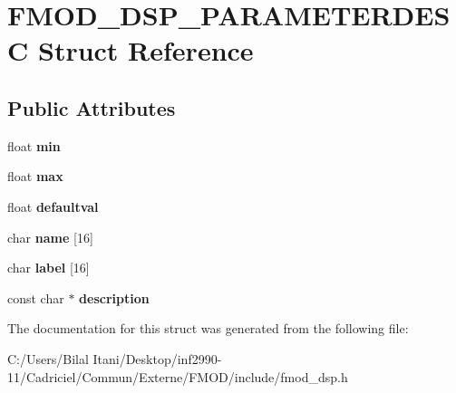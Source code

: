 \hypertarget{struct_f_m_o_d___d_s_p___p_a_r_a_m_e_t_e_r_d_e_s_c}{}\section{F\+M\+O\+D\+\_\+\+D\+S\+P\+\_\+\+P\+A\+R\+A\+M\+E\+T\+E\+R\+D\+E\+SC Struct Reference}
\label{struct_f_m_o_d___d_s_p___p_a_r_a_m_e_t_e_r_d_e_s_c}
\subsection*{Public Attributes}
\begin{DoxyCompactItemize}
\item 
float {\bfseries min}\hypertarget{struct_f_m_o_d___d_s_p___p_a_r_a_m_e_t_e_r_d_e_s_c_a6a70d0988ed0a13192f2d2beb2bd5595}{}\label{struct_f_m_o_d___d_s_p___p_a_r_a_m_e_t_e_r_d_e_s_c_a6a70d0988ed0a13192f2d2beb2bd5595}

\item 
float {\bfseries max}\hypertarget{struct_f_m_o_d___d_s_p___p_a_r_a_m_e_t_e_r_d_e_s_c_aabb0d4e04d947e9830378115e3085402}{}\label{struct_f_m_o_d___d_s_p___p_a_r_a_m_e_t_e_r_d_e_s_c_aabb0d4e04d947e9830378115e3085402}

\item 
float {\bfseries defaultval}\hypertarget{struct_f_m_o_d___d_s_p___p_a_r_a_m_e_t_e_r_d_e_s_c_a9f47edb0a65cceaa81dd3cc77a272734}{}\label{struct_f_m_o_d___d_s_p___p_a_r_a_m_e_t_e_r_d_e_s_c_a9f47edb0a65cceaa81dd3cc77a272734}

\item 
char {\bfseries name} \mbox{[}16\mbox{]}\hypertarget{struct_f_m_o_d___d_s_p___p_a_r_a_m_e_t_e_r_d_e_s_c_a1619c32ff0267079429a9fa4c76f5745}{}\label{struct_f_m_o_d___d_s_p___p_a_r_a_m_e_t_e_r_d_e_s_c_a1619c32ff0267079429a9fa4c76f5745}

\item 
char {\bfseries label} \mbox{[}16\mbox{]}\hypertarget{struct_f_m_o_d___d_s_p___p_a_r_a_m_e_t_e_r_d_e_s_c_a989bbcd725bbe64d8ec330be19037d78}{}\label{struct_f_m_o_d___d_s_p___p_a_r_a_m_e_t_e_r_d_e_s_c_a989bbcd725bbe64d8ec330be19037d78}

\item 
const char $\ast$ {\bfseries description}\hypertarget{struct_f_m_o_d___d_s_p___p_a_r_a_m_e_t_e_r_d_e_s_c_aff99d44f94a9bcded22e7a24a8976f41}{}\label{struct_f_m_o_d___d_s_p___p_a_r_a_m_e_t_e_r_d_e_s_c_aff99d44f94a9bcded22e7a24a8976f41}

\end{DoxyCompactItemize}


The documentation for this struct was generated from the following file\+:\begin{DoxyCompactItemize}
\item 
C\+:/\+Users/\+Bilal Itani/\+Desktop/inf2990-\/11/\+Cadriciel/\+Commun/\+Externe/\+F\+M\+O\+D/include/fmod\+\_\+dsp.\+h\end{DoxyCompactItemize}
